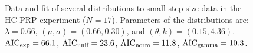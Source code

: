 \documentclass{article}
\newcommand{\tn}{\textnormal}
\begin{document}
\begin{figure}
\begin{subfigure}{0.48\textwidth}
  \end{subfigure}
  \caption[HC step size fit]{Data and fit of several distributions to
    small step size data in the HC PRP experiment ($N =
    17$). Parameters of the distributions are: $\lambda = 0.66$,
    $(\mu, \sigma) = (0.66, 0.30)$, and $(\theta, k) = (0.15,
    4.36)$. $\tn{AIC}_\tn{exp} = 66.1$, $\tn{AIC}_\tn{unif} = 23.6$,
    $\tn{AIC}_\tn{norm} = 11.8$, $\tn{AIC}_\tn{gamma} = 10.3$.}
  \label{fig:hc-prp-step-fit}
\end{figure}
\end{document}
